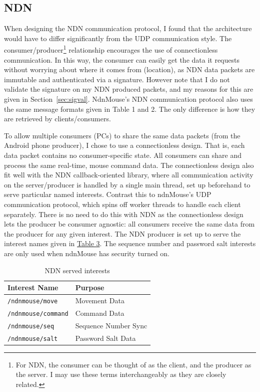 \documentclass{sig-alternate}
\renewcommand\_{\textunderscore\allowbreak}  %
\begin{document}
\subsection{NDN}
When designing the NDN communication protocol, I found that the architecture would have to differ significantly from the UDP communication style. The consumer/producer\footnote{For NDN, the consumer can be thought of as the client, and the producer as the server. I may use these terms interchangeably as they are closely related.} relationship encourages the use of connectionless communication. In this way, the consumer can easily get the data it requests without worrying about where it comes from (location), as NDN data packets are immutable and authenticated via a signature. However note that I do not validate the signature on my NDN produced packets, and my reasons for this are given in Section~\ref{sec:sigval}. NdnMouse's NDN communication protocol also uses the same message formats given in Table 1 and 2. The only difference is how they are retrieved by clients/consumers.

To allow multiple consumers (PCs) to share the same data packets (from the Android phone producer), I chose to use a connectionless design. That is, each data packet contains no consumer-specific state. All consumers can share and process the same real-time, mouse command data. The connectionless design also fit well with the NDN callback-oriented library, where all communication activity on the server/producer is handled by a single main thread, set up beforehand to serve particular named interests. Contrast this to ndnMouse's UDP communication protocol, which spins off worker threads to handle each client separately. There is no need to do this with NDN as the connectionless design lets the producer be consumer agnostic: all consumers receive the same data from the producer for any given interest. The NDN producer is set up to serve the interest names given in \hyperlink{tab:ndnInterestNames}{Table 3}. The sequence number and password salt interests are only used when ndnMouse has security turned on.

\begin{table}
	\hypertarget{tab:ndnInterestNames}{}
	\begin{center}
		\begin{tabular}{| l | l |}
			\hline
			 Interest Name & Purpose \\ \hline\hline
			\texttt{/ndnmouse/move} & Movement Data\\ \hline
			\texttt{/ndnmouse/command} & Command Data\\ \hline
			\texttt{/ndnmouse/seq} & Sequence Number Sync\\ \hline
			\texttt{/ndnmouse/salt} & Password Salt Data\\ \hline
		\end{tabular}
		\caption{NDN served interests}
	\end{center}
\end{table}
\end{document}
